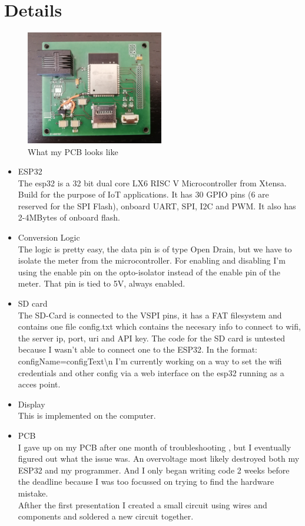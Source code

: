 \documentclass[a4paper,twoside, 12pt]{report}
\theoremstyle{break}
\begin{document}
\section{Details}
\begin{figure}[!ht]
  \centering
  \includegraphics[width=6cm]{SEM.jpg}
  \qquad
  \caption{What my PCB looks like}
\end{figure}
\begin{itemize}
\item ESP32\\
The esp32 is a 32 bit dual core LX6 RISC V Microcontroller from Xtensa. Build for the purpose of IoT applications. It has 30 GPIO pins (6 are reserved for the SPI Flash), onboard UART, SPI, I2C and PWM. It also has 2-4MBytes of onboard flash.
\item Conversion Logic\\
The logic is pretty easy, the data pin is of type Open Drain, but we have to isolate the meter from the microcontroller. For enabling and disabling I'm using the enable pin on the opto-isolator instead of the enable pin of the meter. That pin is tied to 5V, always enabled.
\item SD card\\
The SD-Card is connected to the VSPI pins, it has a FAT filesystem and contains one file config.txt which contains the necesary info to connect to wifi, the server ip, port, uri and API key. The code for the SD card is untested because I wasn't able to connect one to the ESP32.
In the format: configName=configText\textbackslash n
I'm currently working on a way to set the wifi credentials and other config via a web interface on the esp32 running as a acces point.
\item Display\\
This is implemented on the computer.
\item PCB \\
I gave up on my PCB after one month of troubleshooting , but I eventually figured out what the issue was. An overvoltage most likely destroyed both my ESP32 and my programmer.
And I only began writing code 2 weeks before the deadline because I was too focussed on trying to find the hardware mistake.\\
Afther the first presentation I created a small circuit using wires and components and soldered a new circuit together.
\end{itemize}
\end{document}
